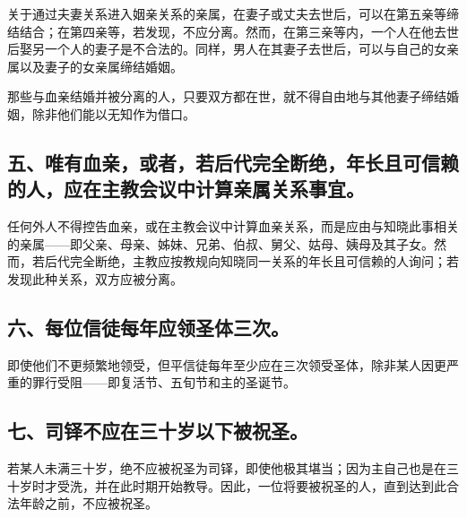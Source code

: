 关于通过夫妻关系进入姻亲关系的亲属，在妻子或丈夫去世后，可以在第五亲等缔结结合；在第四亲等，若发现，不应分离。然而，在第三亲等内，一个人在他去世后娶另一个人的妻子是不合法的。同样，男人在其妻子去世后，可以与自己的女亲属以及妻子的女亲属缔结婚姻。\par

\par

那些与血亲结婚并被分离的人，只要双方都在世，就不得自由地与其他妻子缔结婚姻，除非他们能以无知作为借口。\par


\subsection{五、唯有血亲，或者，若后代完全断绝，年长且可信赖的人，应在主教会议中计算亲属关系事宜。}

任何外人不得控告血亲，或在主教会议中计算血亲关系，而是应由与知晓此事相关的亲属——即父亲、母亲、姊妹、兄弟、伯叔、舅父、姑母、姨母及其子女。然而，若后代完全断绝，主教应按教规向知晓同一关系的年长且可信赖的人询问；若发现此种关系，双方应被分离。\par


\subsection{六、每位信徒每年应领圣体三次。}

即使他们不更频繁地领受，但平信徒每年至少应在三次领受圣体，除非某人因更严重的罪行受阻——即复活节、五旬节和主的圣诞节。\par


\subsection{七、司铎不应在三十岁以下被祝圣。}

若某人未满三十岁，绝不应被祝圣为司铎，即使他极其堪当；因为主自己也是在三十岁时才受洗，并在此时期开始教导。因此，一位将要被祝圣的人，直到达到此合法年龄之前，不应被祝圣。\par



